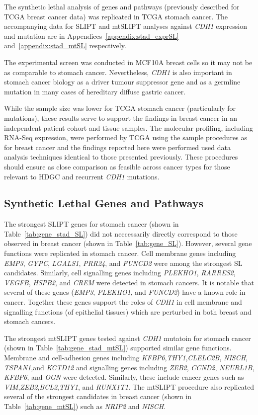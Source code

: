 The synthetic lethal analysis of genes and pathways (previously described for TCGA breast cancer data) was replicated in TCGA stomach cancer. The accompanying data for \gls{SLIPT} and mtSLIPT analyses against \textit{CDH1} expression and mutation are in Appendices~\ref{appendix:stad_exprSL} and~\ref{appendix:stad_mtSL} respectively.

The experimental screen \citep{Telford2015} was conducted in MCF10A breast cells so it may not be as comparable to stomach cancer. Nevertheless, \textit{CDH1} is also important in stomach cancer biology as a driver tumour suppressor gene and as a germline mutation in many cases of hereditary diffuse gastric cancer.

While the sample size was lower for TCGA stomach cancer (particularly for mutations), these results serve to support the findings in breast cancer in an independent patient cohort and tissue samples. The molecular profiling, including RNA-Seq expression, were performed by TCGA using the sample procedures as for breast cancer and the findings reported here were performed used data analysis techniques identical to those presented previously. These procedures should ensure as close comparison as feasible across cancer types for those relevant to HDGC and recurrent \textit{CDH1} mutations.

\subsection{Synthetic Lethal Genes and Pathways} \label{chapt3:stad_SL_genes}

The strongest \gls{SLIPT} genes for stomach cancer (shown in Table~\ref{tab:gene_stad_SL}) did not neccessarily directly correspond to those observed in breast cancer (shown in Table~\ref{tab:gene_SL}). However, several gene functions were replicated in stomach cancer. Cell membrane genes including \textit{EMP3}, \textit{GYPC},  \textit{LGALS1}, \textit{PRR24},  and \textit{FUNCD2} were among the strongest SL candidates. Similarly, cell signalling genes including \textit{PLEKHO1}, \textit{RARRES2}, \textit{VEGFB}, \textit{HSPB2}, and \textit{CREM} were detected in stomach cancers. It is notable that several of these genes (\textit{EMP3}, \textit{PLEKHO1}, and \textit{FUNCD2}) have a known role in cancer. Together these genes support the roles of \textit{CDH1} in cell membrane and signalling functions (of epithelial tissues) which are perturbed in both breast and stomach cancers.

The strongest mtSLIPT genes tested against \textit{CDH1} mutatoin for stomach cancer (shown in Table~\ref{tab:gene_stad_mtSL}) supported similar gene functions. Membrane and cell-adhesion genes including \textit{KFBP6},\textit{THY1},\textit{CLELC2B}, \textit{NISCH}, \textit{TSPAN1},and \textit{KCTD12} and signalling genes including \textit{ZEB2}, \textit{CCND2}, \textit{NEURL1B}, \textit{KFBP6}, and \textit{OGN} were detected. Similarly, these include cancer genes such as \textit{VIM},\textit{ZEB2},\textit{BCL2},\textit{THY1}, and \textit{RUNX1T1}. The mtSLIPT procedure also replicated several of the strongest candidates in breast cancer (shown in Table~\ref{tab:gene_mtSL}) such as \textit{NRIP2} and \textit{NISCH}.

